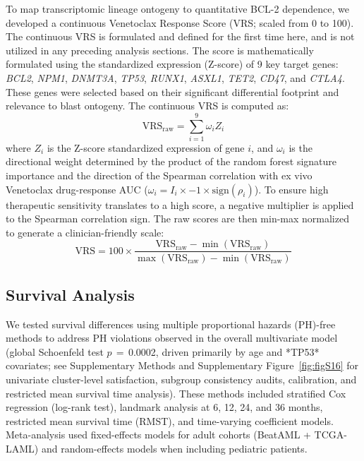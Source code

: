 \documentclass[11pt,a4paper]{article}
\newcommand{\pval}[1]{$p$\,$=$\,#1}
\begin{document}
To map transcriptomic lineage ontogeny to quantitative BCL-2 dependence, we developed a continuous Venetoclax Response Score (VRS; scaled from 0 to 100). The continuous VRS is formulated and defined for the first time here, and is not utilized in any preceding analysis sections. The score is mathematically formulated using the standardized expression (Z-score) of 9 key target genes: \textit{BCL2}, \textit{NPM1}, \textit{DNMT3A}, \textit{TP53}, \textit{RUNX1}, \textit{ASXL1}, \textit{TET2}, \textit{CD47}, and \textit{CTLA4}. These genes were selected based on their significant differential footprint and relevance to blast ontogeny. The continuous VRS is computed as:
\begin{equation}
\text{VRS}_{\text{raw}} = \sum_{i=1}^{9} \omega_i Z_i
\end{equation}
where $Z_i$ is the Z-score standardized expression of gene $i$, and $\omega_i$ is the directional weight determined by the product of the random forest signature importance and the direction of the Spearman correlation with ex vivo Venetoclax drug-response AUC ($\omega_i = I_i \times -1 \times \text{sign}(\rho_i)$). To ensure high therapeutic sensitivity translates to a high score, a negative multiplier is applied to the Spearman correlation sign. The raw scores are then min-max normalized to generate a clinician-friendly scale:
\begin{equation}
\text{VRS} = 100 \times \frac{\text{VRS}_{\text{raw}} - \min(\text{VRS}_{\text{raw}})}{\max(\text{VRS}_{\text{raw}}) - \min(\text{VRS}_{\text{raw}})}
\end{equation}

\subsection{Survival Analysis}

We tested survival differences using multiple proportional hazards (PH)-free methods to address PH violations observed in the overall multivariate model (global Schoenfeld test \pval{0.0002}, driven primarily by age and *TP53* covariates; see Supplementary Methods and Supplementary Figure~\ref{fig:figS16} for univariate cluster-level satisfaction, subgroup consistency audits, calibration, and restricted mean survival time analysis). These methods included stratified Cox regression (log-rank test), landmark analysis at 6, 12, 24, and 36 months, restricted mean survival time (RMST), and time-varying coefficient models. Meta-analysis used fixed-effects models for adult cohorts (BeatAML + TCGA-LAML) and random-effects models when including pediatric patients.
\end{document}
